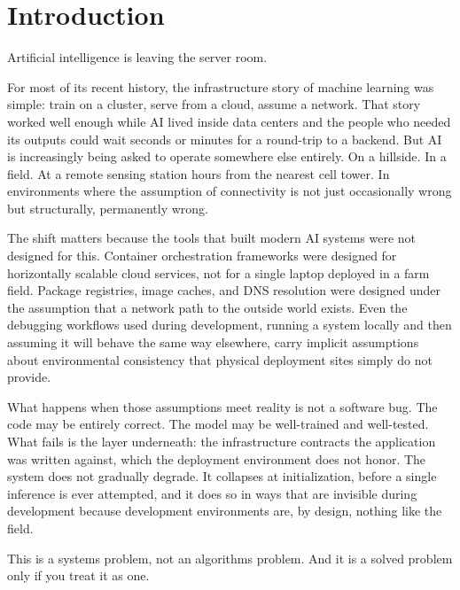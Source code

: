 
\chapter{Introduction}
\label{ch:introduction}

\noindent Artificial intelligence is leaving the server room.
 
For most of its recent history, the infrastructure story of machine learning was simple: train on a cluster, serve from a cloud, assume a network. That story worked well enough while AI lived inside data centers and the people who needed its outputs could wait seconds or minutes for a round-trip to a backend. But AI is increasingly being asked to operate somewhere else entirely. On a hillside. In a field. At a remote sensing station hours from the nearest cell tower\cite{zhou2019edge}. In environments where the assumption of connectivity is not just occasionally wrong but structurally, permanently wrong.
 
The shift matters because the tools that built modern AI systems were not designed for this. Container orchestration frameworks were designed for horizontally scalable cloud services, not for a single laptop deployed in a farm field\cite{burns2016borg}. Package registries, image caches, and DNS resolution were designed under the assumption that a network path to the outside world exists. Even the debugging workflows used during development, running a system locally and then assuming it will behave the same way elsewhere, carry implicit assumptions about environmental consistency that physical deployment sites simply do not provide.
 
What happens when those assumptions meet reality is not a software bug. The code may be entirely correct. The model may be well-trained and well-tested. What fails is the layer underneath: the infrastructure contracts the application was written against, which the deployment environment does not honor. The system does not gradually degrade. It collapses at initialization, before a single inference is ever attempted, and it does so in ways that are invisible during development because development environments are, by design, nothing like the field.
 
This is a systems problem, not an algorithms problem. And it is a solved problem only if you treat it as one.
 
